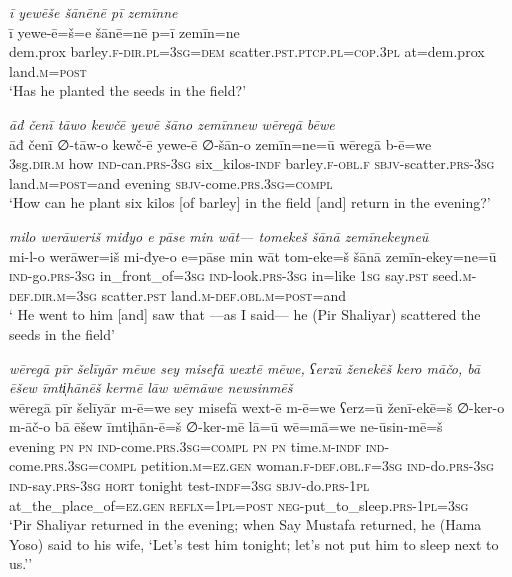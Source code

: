 \ea \label{ŽP.44}
\textit{ī yewēše šānēnē pī zemīnne} \\ 
\gll ī yewe-ē=š=e šānē=nē p=ī zemīn=ne \\ 
 dem.prox barley\textsc{.f}\textsc{-dir}\textsc{.pl}\textsc{=3sg}\textsc{=dem} scatter\textsc{.pst}\textsc{.ptcp}\textsc{.pl}\textsc{=cop}\textsc{.3pl} at=dem.prox land\textsc{.m}\textsc{=\textsc{post}} \\ 
\glt `Has he planted the seeds in the field?'
\z 
 
\ea \label{ŽP.46}
\textit{āđ čenī tāwo kewčē yewē šāno zemīnnew wēregā bēwe} \\ 
\gll āđ čenī ∅-tāw-o kewč-ē yewe-ē ∅-šān-o zemīn=ne=ū wēregā b-ē=we \\ 
 3sg\textsc{.dir}\textsc{.m} how \textsc{ind-}can\textsc{.prs}\textsc{-3sg} six\_kilos\textsc{-indf} barley\textsc{.f}\textsc{-obl}\textsc{.f} \textsc{sbjv-}scatter\textsc{.prs}\textsc{-3sg} land\textsc{.m}\textsc{=\textsc{post}}=and evening \textsc{sbjv-}come\textsc{.prs}\textsc{.3sg}\textsc{=compl} \\ 
\glt `How can he plant six kilos [of barley] in the field [and] return in the evening?'
\z 
 
\ea \label{ŽP.51}
\textit{milo werāweriš miđyo e pāse min wāt— tomekeš šānā zemīnekeyneū} \\ 
\gll mi-l-o werāwer=iš mi-đye-o e=pāse min wāt tom-eke=š šānā zemīn-ekey=ne=ū \\ 
 \textsc{ind-}go\textsc{.prs}\textsc{-3sg} in\_front\_of\textsc{=3sg} \textsc{ind-}look\textsc{.prs}\textsc{-3sg} in=like \textsc{1sg} say\textsc{.pst} seed\textsc{.m}\textsc{-def}\textsc{.dir}\textsc{.m}\textsc{=3sg} scatter\textsc{.pst} land\textsc{.m}\textsc{-def}\textsc{.obl}\textsc{.m}\textsc{=\textsc{post}}=and \\ 
\glt ` He went to him [and] saw that —as I said— he (Pir Shaliyar) scattered the seeds in the field'
\z 
 
\ea \label{ŽP.62}
\textit{wēregā pīr šelīyār mēwe sey misefā wextē mēwe, ʕerzū ženekēš kero māčo, bā ēšew īmti̩hānēš kermē lāw wēmāwe newsinmēš} \\ 
\gll wēregā pīr šelīyār m-ē=we sey misefā wext-ē m-ē=we ʕerz=ū ženī-ekē=š ∅-ker-o m-āč-o bā ēšew īmti̩hān-ē=š ∅-ker-mē lā=ū wē=mā=we ne-ūsin-mē=š \\ 
 evening \textsc{pn} \textsc{pn} \textsc{ind-}come\textsc{.prs}\textsc{.3sg}\textsc{=compl} \textsc{pn} \textsc{pn} time\textsc{.m}\textsc{-indf} \textsc{ind-}come\textsc{.prs}\textsc{.3sg}\textsc{=compl} petition\textsc{.m}\textsc{\textsc{=ez.gen}} woman\textsc{.f}\textsc{-def}\textsc{.obl}\textsc{.f}\textsc{=3sg} \textsc{ind-}do\textsc{.prs}\textsc{-3sg} \textsc{ind-}say\textsc{.prs}\textsc{-3sg} \textsc{hort} tonight test\textsc{-indf}\textsc{=3sg} \textsc{sbjv-}do\textsc{.prs}\textsc{-1pl} at\_the\_place\_of\textsc{\textsc{=ez.gen}} \textsc{reflx}\textsc{=1pl}\textsc{=\textsc{post}} \textsc{neg-}put\_to\_sleep\textsc{.prs}\textsc{-1pl}\textsc{=3sg} \\ 
\glt `Pir Shaliyar returned in the evening; when Say Mustafa returned, he (Hama Yoso) said to his wife, ‘Let’s test him tonight; let’s not put him to sleep next to us.’'
\z 
 

